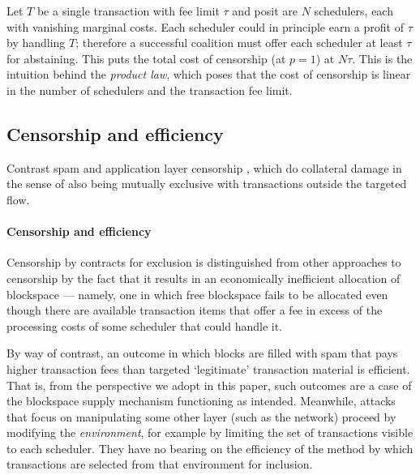 \begin{example}

  Let $T$ be a single transaction with fee limit $\tau$ and posit are $N$ schedulers, each with vanishing marginal costs.
  Each scheduler could in principle earn a profit of $\tau$ by handling $T$; therefore a successful coalition must offer each scheduler at least $\tau$ for abstaining.
  This puts the total cost of censorship (at $p=1$) at $N\tau$.
  This is the intuition behind the \emph{product law}, which poses that the cost of censorship is linear in the number of schedulers and the transaction fee limit.

\end{example}




\subsection{Censorship and efficiency}

Contrast spam and application layer censorship \cite[Def.~4]{wahrstatter2024blockchain}, which do collateral damage in the sense of also being mutually exclusive with transactions outside the targeted flow.

\paragraph{Censorship and efficiency}
Censorship by contracts for exclusion is distinguished from other approaches to censorship by the fact that it results in an economically inefficient allocation of blockspace --- namely, one in which free blockspace fails to be allocated even though there are available transaction items that offer a fee in excess of the processing costs of some scheduler that could handle it.
%


By way of contrast, an outcome in which blocks are filled with spam that pays higher transaction fees than targeted `legitimate' transaction material is efficient.
%
That is, from the perspective we adopt in this paper, such outcomes are a case of the blockspace supply mechanism functioning as intended.
%
Meanwhile, attacks that focus on manipulating some other layer (such as the network) proceed by modifying the \emph{environment}, for example by limiting the set of transactions visible to each scheduler.
%
They have no bearing on the efficiency of the method by which transactions are selected from that environment for inclusion.


